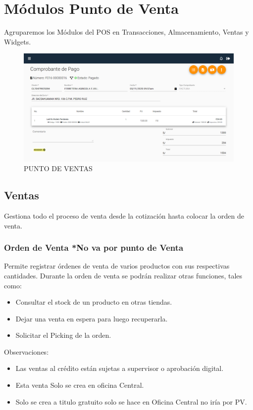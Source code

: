 \documentclass[pdftex,12pt,oneside,a4paper,spanish, english, brazil]{abntex2}
\begin{document}
\begin{sloppypar}
            \chapter{Módulos Punto de Venta}
           	Agruparemos los Módulos del POS en Transacciones, Almacenamiento, Ventas y Widgets.
           	     \begin{figure}[h!]
           		\centering
           		\caption{PUNTO DE VENTAS} \label{fig:maia}
           		\includegraphics[width=0.6\linewidth,frame=0.5pt 5pt]{img/PV}
           	\end{figure}
              \section{Ventas}
              Gestiona todo el proceso de venta desde la cotización hasta colocar la orden de venta.
              \subsection{Orden de Venta *No va por punto de Venta}
              Permite registrar órdenes de venta de varios productos con sus respectivas cantidades.
              Durante la orden de venta se podrán realizar otras funciones, tales como:
              \begin{itemize}
              	\item	Consultar el stock de un producto en otras tiendas.
              	\item	Dejar una venta en espera para luego recuperarla.
              	\item	Solicitar el Picking de la orden.
              \end{itemize}
              Observaciones:
              \begin{itemize}
              	\item Las ventas al crédito están sujetas a supervisor o aprobación digital.
              	\item Esta venta Solo se crea en oficina Central.
              	\item Solo se crea a titulo gratuito solo se hace en Oficina Central no iría por PV.
              \end{itemize}

\end{sloppypar}
\end{document}
